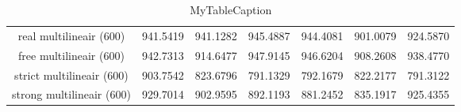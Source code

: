 \begin{table}
\centering
\begin{tabular}{|c|c|c|c|c|c|c|}
\hline
 &  &  &  &  &  &  \\
\hline
real multilineair (600) & 941.5419 & 941.1282 & 945.4887 & 944.4081 & 901.0079 & 924.5870 \\
\hline
free multilineair (600) & 942.7313 & 914.6477 & 947.9145 & 946.6204 & 908.2608 & 938.4770 \\
\hline
strict multilineair (600) & 903.7542 & 823.6796 & 791.1329 & 792.1679 & 822.2177 & 791.3122 \\
\hline
strong multilineair (600) & 929.7014 & 902.9595 & 892.1193 & 881.2452 & 835.1917 & 925.4355 \\
\hline
\end{tabular}
\caption{MyTableCaption}
\label{table:MyTableLabel}
\end{table}

